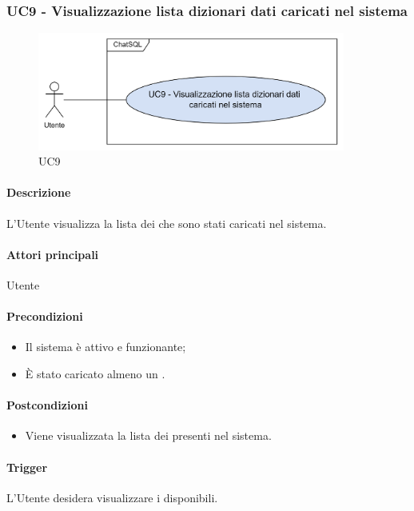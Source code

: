 \subsubsection{UC9 - Visualizzazione lista dizionari dati caricati nel sistema}\label{UC9}

\begin{figure}[H]
  \centering
  \includegraphics[width=0.90\textwidth]{assets/uc9.png}
  \caption{UC9}
\end{figure}

\paragraph*{Descrizione}
L'Utente visualizza la lista dei  che sono stati caricati nel sistema.

\paragraph*{Attori principali}
Utente

\paragraph*{Precondizioni}
\begin{itemize}
  \item Il sistema è attivo e funzionante;
  \item È stato caricato almeno un .  
\end{itemize}

\paragraph*{Postcondizioni}
\begin{itemize}
\item Viene visualizzata la lista dei  presenti nel sistema.
\end{itemize}

\paragraph*{Trigger}
L'Utente desidera visualizzare i  disponibili.

